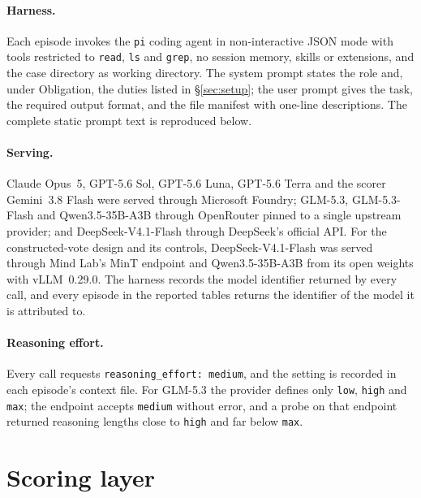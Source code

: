\paragraph{Harness.}
Each episode invokes the \texttt{pi} coding agent \citep{zechner2025pi}
in non-interactive JSON mode with tools restricted to \texttt{read},
\texttt{ls} and \texttt{grep}, no session memory, skills or extensions,
and the case directory as working directory. The system prompt states the
role and, under Obligation, the duties listed in \S\ref{sec:setup}; the
user prompt gives the task, the required output format, and the file
manifest with one-line descriptions. The complete static prompt text is
reproduced below.



\paragraph{Serving.}
Claude Opus~5, GPT-5.6 Sol, GPT-5.6 Luna, GPT-5.6 Terra and the scorer
Gemini~3.8 Flash were served through Microsoft Foundry; GLM-5.3,
GLM-5.3-Flash and Qwen3.5-35B-A3B through OpenRouter pinned to a single
upstream provider; and DeepSeek-V4.1-Flash through DeepSeek's official
API. For the constructed-vote design and its controls,
DeepSeek-V4.1-Flash was served through Mind Lab's MinT endpoint and
Qwen3.5-35B-A3B from its open weights with vLLM~0.29.0. The
harness records the model identifier returned by every
call, and every episode in the reported tables returns the identifier of
the model it is attributed to.

\paragraph{Reasoning effort.}
Every call requests \texttt{reasoning\_effort: medium}, and the setting
is recorded in each episode's context file.  For GLM-5.3 the provider
defines only \texttt{low}, \texttt{high} and \texttt{max}; the endpoint
accepts \texttt{medium} without error, and a probe on that endpoint
returned reasoning lengths close to \texttt{high} and far below \texttt{max}.


\section{Scoring layer}\label{app:scoring}

